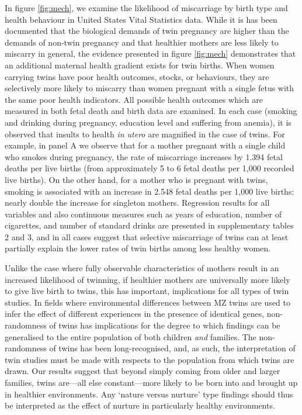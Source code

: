 \documentclass{nature}
\begin{document}
\begin{linenumbers}
In figure \ref{fig:mech}, we examine the likelihood of miscarriage by birth type and health behaviour in United States Vital Statistics data.  While it is has been documented that the biological demands of twin pregnancy are higher than the demands of non-twin pregnancy\cite{Shinagawaetal2005,Kahnetal2003} and that healthier mothers are less likely to miscarry in general\cite{Frettsetal1995,Garciaetal2002}, the evidence presented in figure \ref{fig:mech} demonstrates that an additional maternal health gradient exists for twin births. When women carrying twins have poor health outcomes, stocks, or behaviours, they are selectively more likely to miscarry than women pregnant with a single fetus with the same poor health indicators.  All possible health outcomes which are measured in both fetal death and birth data are examined.  In each case (smoking and drinking during pregnancy, education level and suffering from anemia), it is observed that insults to health \emph{in utero} are magnified in the case of twins.  For example, in panel A we observe that for a mother pregnant with a single child who smokes during pregnancy, the rate of miscarriage increases by 1.394 fetal deaths per live births (from approximately 5 to 6 fetal deaths per 1,000 recorded live births).  On the other hand, for a mother who is pregnant with twins, smoking is associated with an increase in 2.548 fetal deaths per 1,000 live births: nearly double the increase for singleton mothers.  Regression results for all variables and also continuous measures such as years of education, number of cigarettes, and number of standard drinks are presented in supplementary tables 2 and 3, and in all cases suggest that selective miscarriage of twins can at least partially explain the lower rates of twin births among less healthy women.  

Unlike the case where fully observable characteristics of mothers result in an increased likelihood of twinning, if healthier mothers are universally more likely to give live birth to twins, this has important, implications for all types of twin studies.  In fields where environmental differences between MZ twins are used to infer the effect of different experiences in the presence of identical genes, non-randomness of twins has implications for the degree to which findings can be generalised to the entire population of both children \emph{and} families.  The non-randomness of twins has been long-recognised\cite{Recordetal1970}, and, as such, the interpretation of twin studies must be made with respects to the population from which twins are drawn.  Our results suggest that beyond simply coming from older and larger families, twins are---all else constant---more likely to be born into and brought up in healthier environments.  Any `nature versus nurture' type findings should thus be interpreted as the effect of nurture in particularly healthy environments.


\end{linenumbers}
\end{document}
